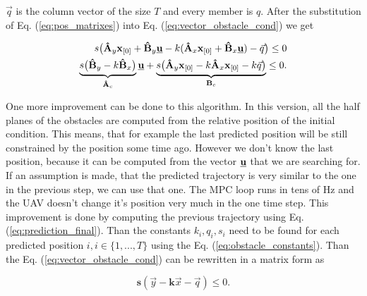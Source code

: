 \documentclass[a4paper,11pt,titlepage]{article}
\newcommand{\uvec}{\textbf{\underline{u}}}
\begin{document}
$\vec{q}$ is the column vector of the size $T$ and every member is $q$.
 After the substitution of Eq. (\ref{eq:pos_matrixes}) into Eq. (\ref{eq:vector_obstacle_cond}) we get
 
\begin{equation}
\begin{split}
s\big(\textbf{\^A}_y \textbf{x}_{[0]} + \textbf{\^B}_y \uvec - k(\textbf{\^A}_x \textbf{x}_{[0]} + \textbf{\^B}_x \uvec) - \vec{q}\big) \leq 0 \\
\underbrace{s\big(\textbf{\^B}_y-k\textbf{\^B}_x\big)}_{\textbf{\^A}_c} \uvec +
\underbrace{s\big(\textbf{\^A}_y \textbf{x}_{[0]} - k\textbf{\^A}_x \textbf{x}_{[0]} -k\vec{q}\big)}_{\textbf{B}_c} \leq 0.
\end{split}
\end{equation}

One more improvement can be done to this algorithm. In this version, all the half planes of the obstacles are computed from the relative position of the initial condition. This means, that for example the last predicted position will be still constrained by the position some time ago. However we don't know the last position, because it can be computed from the vector $\uvec$ that we are searching for. If an assumption is made, that the predicted trajectory is very similar to the one in the previous step, we can use that one. The MPC loop runs in tens of Hz and the UAV doesn't change it's position very much in the one time step. This improvement is done by computing the previous trajectory using Eq. (\ref{eq:prediction_final}). Than the constants $k_{i}, q_{i}, s_{i}$ need to be found for each predicted position $i, i\in\{1,...,T\}$ using the Eq. (\ref{eq:obstacle_constants}). Than the Eq. (\ref{eq:vector_obstacle_cond}) can be rewritten in a matrix form as

\begin{equation}
\label{eq:matrix_obstacle_cond}
\textbf{s}(\vec{y} - \textbf{k}\vec{x} - \vec{q}) \leq 0.
\end{equation}
\end{document}
